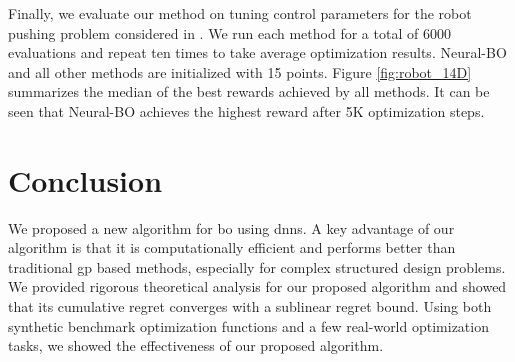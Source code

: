 Finally, we evaluate our method on tuning control parameters for the robot pushing problem considered in \citet{wang2017max}. We run each method for a total of 6000 evaluations and repeat ten times to take average optimization results. Neural-BO and all other methods are initialized with 15 points. Figure \ref{fig:robot_14D} summarizes the median of the best rewards achieved by all methods. It can be seen that Neural-BO achieves the highest reward after 5K optimization steps. 

\section{Conclusion}
We proposed a new algorithm for \acl{bo} using \aclp{dnn}. A key advantage of our algorithm is that it is computationally efficient and performs better than traditional \acl{gp} based methods, especially for complex structured design problems. We provided rigorous theoretical analysis for our proposed algorithm and showed that its cumulative regret converges with a sublinear regret bound. Using both synthetic benchmark optimization functions and a few real-world optimization tasks, we showed the effectiveness of our proposed algorithm. 